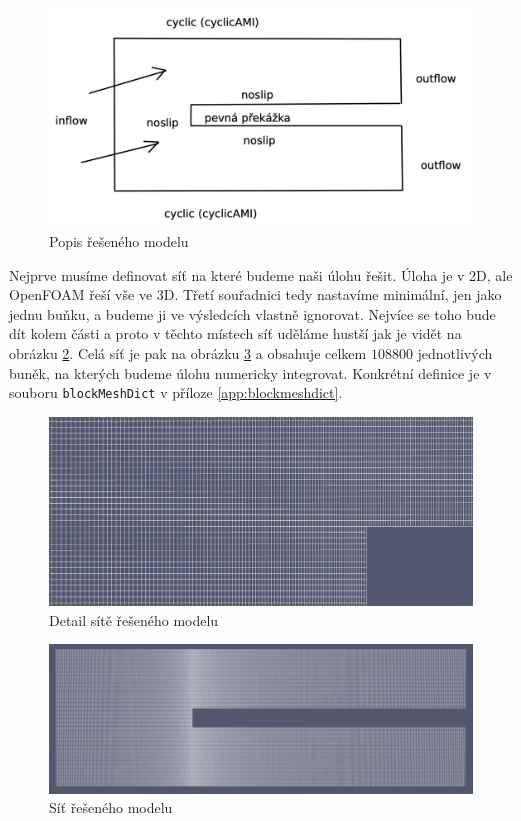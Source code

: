 \documentclass[a4paper,12pt]{report}
\theoremstyle{remark}
\begin{document}
	\begin{figure}[H]
		\centering
		\includegraphics[width=1\linewidth]{zadani.png}
		\caption{Popis řešeného modelu}
		\label{fig:zadani}
	\end{figure}


Nejprve musíme definovat síť na které budeme naši úlohu řešit. Úloha je v 2D, ale OpenFOAM řeší vše ve 3D. Třetí souřadnici tedy nastavíme minimální, jen jako jednu buňku, a budeme ji ve výsledcích vlastně ignorovat.  Nejvíce se toho bude dít kolem  části a proto v těchto místech síť uděláme hustší jak je vidět na obrázku \ref{fig:pvmesh-detail}. Celá síť je pak na obrázku \ref{fig:pvmesh} a obsahuje celkem $108800$ jednotlivých buněk, na kterých budeme úlohu numericky integrovat. Konkrétní definice je v souboru \texttt{blockMeshDict} v příloze \ref{app:blockmeshdict}.

\begin{figure}[H]
	\centering
	\includegraphics[width=1\linewidth]{pv-mesh-detail.png}
	\caption{Detail sítě řešeného modelu}
	\label{fig:pvmesh-detail}
\end{figure}



\begin{figure}[H]
	\centering
	\includegraphics[width=1\linewidth]{pv-mesh.png}
	\caption{Síť řešeného modelu}
	\label{fig:pvmesh}
\end{figure}
\end{document}

